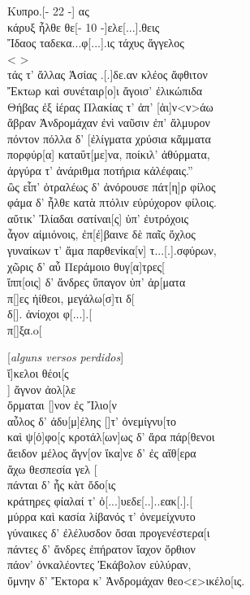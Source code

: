 \begin{gkverse}
Κυπρο.[\qquad     - 22 -\qquad       ] ας\\
κάρυξ ἦλθε θε[\qquad - 10 -\qquad  ]ελε[...].θεις\\
Ἴδαος ταδεκα...φ[...].ις τάχυς ἄγγελος\\
< \qquad			>\\
τάς τ’ ἄλλας Ἀσίας .[.]δε.αν κλέος ἄφθιτον\\
Ἔκτωρ καὶ συνέταιρ[ο]ι ἄγοισ’ ἐλικώπιδα\\
Θήβας ἐξ ἰέρας Πλακίας τ’ ἀπ’ [ἀι]ν<ν>άω\\
ἄβραν Ἀνδρομάχαν ἐνὶ ναῦσιν ἐπ’ ἄλμυρον\\
πόντον πόλλα δ’ [ἐλίγματα χρύσια κἄμματα\\
πορφύρ[α] καταΰτ[με]να, ποίκιλ’ ἀθύρματα,\\
ἀργύρα τ’ ἀνάριθμα ποτήρια κἀλέφαις.''\\
ὢς εἶπ’ ὀτραλέως δ’ ἀνόρουσε πάτ[η]ρ φίλος\\
φάμα δ’ ἦλθε κατὰ πτόλιν εὐρύχορον φίλοις.\\
αὔτικ’ Ἰλίαδαι σατίναι[ς] ὐπ’ ἐυτρόχοις\\
ἆγον αἰμιόνοις, ἐπ[έ]βαινε δὲ παῖς ὄχλος\\
γυναίκων τ’ ἄμα παρθενίκα[ν] τ...[.].σφύρων,\\
χῶρις δ’ αὖ Περάμοιο θυγ[α]τρες[\\
ἴππ[οις] δ’ ἄνδρες ὔπαγον ὐπ’ ἀρ[ματα\\
π[\qquad  ]ες ἠίθεοι, μεγάλω[σ]τι δ[\\
δ[\qquad  ]. ἀνίοχοι φ[...].[\\
π[\qquad  ]ξα.o[

\textnormal{[\emph{alguns versos perdidos}]}\\

\vinphantom{ὄρμαται [\qquad\qquad\quad}    ἴ]κελοι θέοι[ς\\
\vinphantom{ὄρμαται [\qquad\qquad\quad}     ] ἄγνον ἀολ[λε\\
ὄρμαται [\qquad\qquad\quad			     ]νον ἐς Ἴλιο[ν\\
αὖλος δ’ ἀδυ[μ]έλης [\qquad	    ]τ’ ὀνεμίγνυ[το\\
καὶ ψ[ό]φο[ς κροτάλ[ων\qquad    ]ως δ’ ἄρα πάρ[θενοι\\
ἄειδον μέλος ἄγν[ον ἴκα]νε δ’ ἐς αἴθ[ερα\\
ἄχω θεσπεσία γελ [\\
πάνται δ’ ἦς κὰτ ὄδο[ις\\
κράτηρες φίαλαί τ’ ὀ[...]υεδε[..]..εακ[.].[\\
μύρρα καὶ κασία λίβανός τ’ ὀνεμείχνυτο\\
γύναικες δ’ ἐλέλυσδον ὄσαι προγενέστερα[ι\\
πάντες δ’ ἄνδρες ἐπήρατον ἴαχον ὄρθιον\\
πάον’ ὀνκαλέοντες Ἐκάβολον εὐλύραν,\\
ὔμνην δ’ Ἔκτορα κ’ Ἀνδρομάχαν θεο<ε>ικέλο[ις.	
\end{gkverse}

